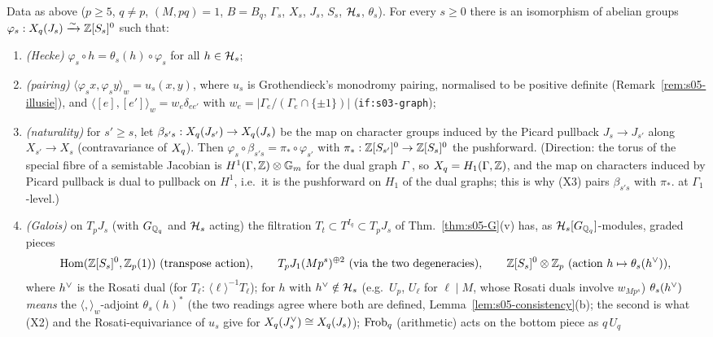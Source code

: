 \begin{hypothesis}\label{hyp:s05-X}
Data as above ($p\ge5$, $q\ne p$, $(M,pq)=1$, $B=B_q$, $\Gamma_s$, $X_s$, $J_s$, $S_s$, $\mathcal{H}_s$, $\theta_s$). For every $s\ge0$ there
is an isomorphism of abelian groups $\varphi_s:X_q(J_s)\xrightarrow{\sim}\mathbb{Z}[S_s]^0$ such that:
\begin{enumerate}[label=(X\arabic*)]
\item \emph{(Hecke)} $\varphi_s\circ h=\theta_s(h)\circ\varphi_s$ for all $h\in\mathcal{H}_s$;
\item \emph{(pairing)} $\langle\varphi_sx,\varphi_sy\rangle_w=u_s(x,y)$, where $u_s$ is Grothendieck's monodromy pairing,
  normalised to be positive definite (Remark~\ref{rem:s05-illusie}), and $\langle[e],[e']\rangle_w=w_e\delta_{ee'}$ with
  $w_e=|\Gamma_e/(\Gamma_e\cap\{\pm1\})|$ (\texttt{if:s03-graph});
\item \emph{(naturality)} for $s'\ge s$, let $\beta_{s's}:X_q(J_{s'})\to X_q(J_s)$ be the map on character groups induced by the
  Picard pullback $J_s\to J_{s'}$ along $X_{s'}\to X_s$ (contravariance of $X_q$). Then $\varphi_s\circ\beta_{s's}=\pi_*\circ\varphi_{s'}$
  with $\pi_*:\mathbb{Z}[S_{s'}]^0\to\mathbb{Z}[S_s]^0$ the pushforward. (Direction: the torus of the special fibre of a semistable Jacobian
  is $H^1(\Gamma,\mathbb{Z})\otimes\mathbb G_m$ for the dual graph $\Gamma$
  , so $X_q=H_1(\Gamma,\mathbb{Z})$, and the
  map on characters induced by Picard pullback is dual to pullback on $H^1$, i.e.\ it is the pushforward on $H_1$ of the dual
  graphs; this is why (X3) pairs $\beta_{s's}$ with $\pi_*$. \stsketch{} at $\Gamma_1$-level.)
\item \emph{(Galois)} on $T_pJ_s$ (with $G_{\mathbb{Q}_q}$ and $\mathcal{H}_s$ acting) the filtration $T_t\subset T^{I_q}\subset T_pJ_s$ of
  Thm.~\ref{thm:s05-G}(v) has, as $\mathcal{H}_s[G_{\mathbb{Q}_q}]$-modules, graded pieces
  \[\operatorname{Hom}(\mathbb{Z}[S_s]^0,\mathbb{Z}_p(1))\ (\text{transpose action}),\qquad T_pJ_1(Mp^s)^{\oplus2}\ (\text{via the two degeneracies}),\qquad
  \mathbb{Z}[S_s]^0\otimes\mathbb{Z}_p\ (\text{action }h\mapsto\theta_s(h^\vee)),\]
  where $h^\vee$ is the Rosati dual (for $T_\ell$: $\langle\ell\rangle^{-1}T_\ell$); for $h$ with $h^\vee\notin\mathcal{H}_s$ (e.g.\ $U_p$, $U_\ell$
  for $\ell\mid M$, whose Rosati duals involve $w_{Mp^s}$) $\theta_s(h^\vee)$ \emph{means} the $\langle,\rangle_w$-adjoint
  $\theta_s(h)^*$ (the two readings agree where both are defined, Lemma~\ref{lem:s05-consistency}(b); the second is what (X2) and the
  Rosati-equivariance of $u_s$ give for $X_q(J_s^\vee)\cong X_q(J_s)$); $\mathrm{Frob}_q$ (arithmetic) acts on the bottom piece as $q\,U_q$

\end{enumerate}
\end{hypothesis}
